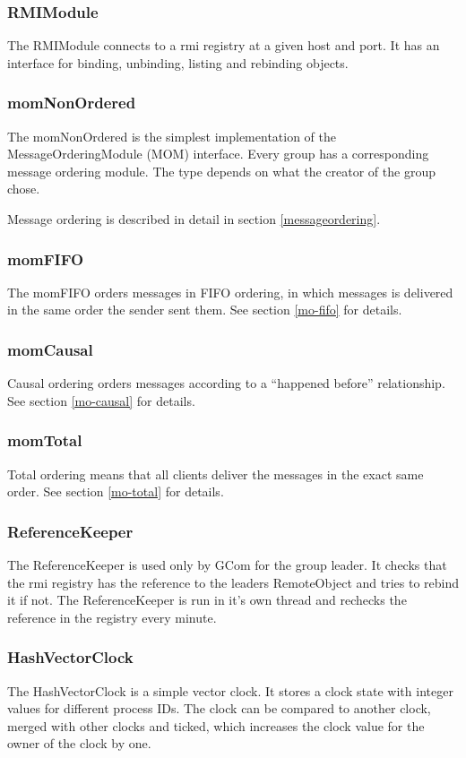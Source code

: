 \documentclass[a4paper,english]{article}
\begin{document}
\subsubsection{RMIModule}
The RMIModule connects to a rmi registry at a given host and port. It has an interface for binding, unbinding, listing and rebinding objects.

\subsubsection{momNonOrdered}
The momNonOrdered is the simplest implementation of the MessageOrderingModule (MOM) interface. Every group has a corresponding message ordering module. The type depends on what the creator of the group chose. 

Message ordering is described in detail in section \vref{messageordering}.

\subsubsection{momFIFO}
The momFIFO orders messages in FIFO ordering, in which messages is delivered in the same order the sender sent them. See section \vref{mo-fifo} for details.

\subsubsection{momCausal}
Causal ordering orders messages according to a ``happened before'' relationship. See section \vref{mo-causal} for details.

\subsubsection{momTotal}
Total ordering means that all clients deliver the messages in the exact same order. See section \vref{mo-total} for details.

\subsubsection{ReferenceKeeper}
The ReferenceKeeper is used only by GCom for the group leader. It checks that the rmi registry has the reference to the leaders RemoteObject and tries to rebind it if not. The ReferenceKeeper is run in it's own thread and rechecks the reference in the registry every minute.

\subsubsection{HashVectorClock}
The HashVectorClock is a simple vector clock. It stores a clock state with integer values for different process IDs. The clock can be compared to another clock, merged with other clocks and ticked, which increases the clock value for the owner of the clock by one.
\end{document}
